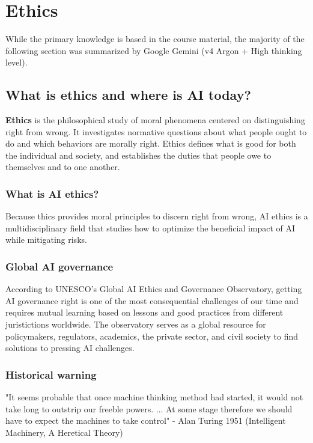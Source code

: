\documentclass[11pt]{article}
\begin{document}
\section{Ethics}
\begin{note}[AI usage]
While the primary knowledge is based in the course material, the majority of the following section was summarized by Google Gemini (v4 Argon + High thinking level).
\end{note}
\subsection{What is ethics and where is AI today?}
\begin{definition}[Ethics]
\textbf{Ethics} is the philosophical study of moral phenomena centered on distinguishing right from wrong.
It investigates normative questions about what people ought to do and which behaviors are morally right.
Ethics defines what is good for both the individual and society, and establishes the duties that people owe to themselves and to one another.
\end{definition}
\subsubsection{What is AI ethics?}
Because thics provides moral principles to discern right from wrong, AI ethics is a multidisciplinary field that studies how to optimize the beneficial impact of AI while mitigating risks.
\subsubsection{Global AI governance}
According to UNESCO's Global AI Ethics and Governance Observatory, getting AI governance right is one of the most consequential challenges of our time and requires mutual learning based on lessons and good practices from different juristictions worldwide.
The observatory serves as a global resource for policymakers, regulators, academics, the private sector, and civil society to find solutions to pressing AI challenges.
\subsubsection{Historical warning}
"It seems probable that once machine thinking method had started, it would not take long to outstrip our freeble powers. 
... At some stage therefore we should have to expect the machines to take control" - Alan Turing 1951 (Intelligent Machinery, A Heretical Theory)
\end{document}
